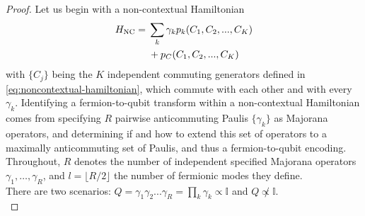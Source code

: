 \documentclass[%
 aip,
 amsmath,amssymb,
 reprint,%
]{revtex4-1}
\newcommand{\noncontextualHamiltonian}{H_{\mathrm{NC}}}
\newcommand{\Id}{\mathbb{I}}       %
\newcommand{\kLinIndepComm}{K}           %
\newcommand{\kLinIndepAnti}{R}           %
\begin{document}
\begin{proof}
Let us begin with a non-contextual Hamiltonian 
    \begin{equation}
    \begin{split}
    \noncontextualHamiltonian = {} & \sum_{{k}} \gamma_{{k}} p_{{k}} {(C_{1}, C_{2}, ..., C_{\kLinIndepComm})} \\
    & + p_C{(C_{1}, C_{2}, ..., C_{\kLinIndepComm})}
    \end{split}
    \notag
    \label{eq:noncontextual-hamiltonian-encoding}
\end{equation}
with $\{C_j\}$ being {the $\kLinIndepComm$ independent commuting generators} defined in \eqref{eq:noncontextual-hamiltonian}{, which commute with each other and with every $\gamma_k$}.
    Identifying a fermion-to-qubit transform within a non-contextual Hamiltonian comes from specifying $\kLinIndepAnti$ pairwise anticommuting Paulis $\{\gamma_{{k}}\}$ as Majorana operators, and determining if and how to extend this set of operators to a maximally anticommuting set of Paulis, and thus a fermion-to-qubit encoding. {Throughout, $\kLinIndepAnti$ denotes the number of independent specified Majorana operators $\gamma_1, \dots, \gamma_\kLinIndepAnti$, and $l = \lfloor \kLinIndepAnti/2 \rfloor$ the number of fermionic modes they define.} \\ 
    
    
    \indent There are two scenarios: $Q=\gamma_1\gamma_2...\gamma_{\kLinIndepAnti} =\prod_{{k}} \gamma_{{k}} {\propto} \Id$ and $Q%
    {\not\propto} \Id$. \\ 


\end{proof}
\end{document}
